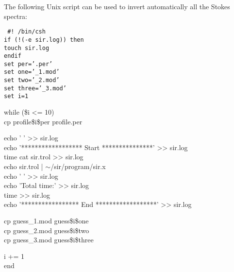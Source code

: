 The following Unix script can be used to invert automatically
all the Stokes spectra:

{\tt 
\noindent       \#! /bin/csh  \\
\noindent       if (!(-e sir.log)) then  \\
\hspace*{2em}      touch sir.log   \\
                endif  \\
		set per='.per'      \\
                set one='\_1.mod'   \\
                set two='\_2.mod'   \\
                set three='\_3.mod'   \\
                set i=1    

\noindent       while (\$i <= 10)  \\
\hspace*{2em}      cp profile\$i\$per profile.per

\noindent  \hspace*{2em} echo ' ' >> sir.log   \\
\hspace*{2em}   echo '******************  Start ***************' >> sir.log  \\
\hspace*{2em}   time cat sir.trol >> sir.log   \\
\hspace*{2em}   echo sir.trol | $\sim$/sir/program/sir.x  \\
\hspace*{2em}   echo ' ' >> sir.log    \\
\hspace*{2em}   echo 'Total time:' >> sir.log \\ 
\hspace*{2em}   time >> sir.log  \\
\hspace*{2em}   echo '*****************  End ******************' >> sir.log  

\noindent  \hspace*{2em} cp guess\_1.mod guess\$i\$one  \\
\hspace*{2em} cp guess\_2.mod guess\$i\$two  \\
\hspace*{2em} cp guess\_3.mod guess\$i\$three  

\noindent  \@ i += 1  \\
end \\ }

